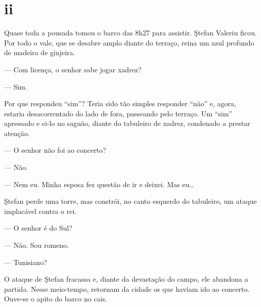 

\section{ii}

 

Quase toda a pousada tomou o barco das 8h27 para assistir. Ştefan
Valeriu ficou. Por todo o vale, que se desabre amplo diante do terraço,
reina um azul profundo de madeira de ginjeira.

--- Com licença, o senhor sabe jogar xadrez?

--- Sim.

Por que respondeu ``sim''? Teria sido tão simples responder ``não'' e,
agora, estaria desacorrentado do lado de fora, passeando pelo terraço.
Um ``sim'' apressado e ei-lo no saguão, diante do tabuleiro de xadrez,
condenado a prestar atenção.


--- O senhor não foi ao concerto?

--- Não.

--- Nem eu. Minha esposa fez questão de ir e deixei. Mas eu\ldots{}

Ştefan perde uma torre, mas constrói, no canto esquerdo do tabuleiro, um
ataque implacável contra o rei.

--- O senhor é do Sul?

--- Não. Sou romeno.


--- Tunisiano?


O ataque de Ştefan fracassa e, diante da devastação do campo, ele
abandona a partida. Nesse meio-tempo, retornam da cidade os que haviam
ido ao concerto. Ouve-se o apito do barco no cais.

